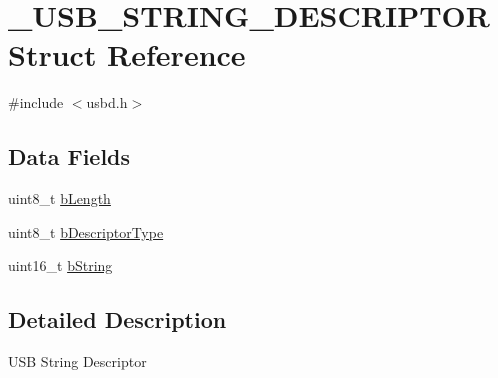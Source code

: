 \hypertarget{struct__USB__STRING__DESCRIPTOR}{\section{\-\_\-\-U\-S\-B\-\_\-\-S\-T\-R\-I\-N\-G\-\_\-\-D\-E\-S\-C\-R\-I\-P\-T\-O\-R Struct Reference}
\label{struct__USB__STRING__DESCRIPTOR}
}


{\ttfamily \#include $<$usbd.\-h$>$}

\subsection*{Data Fields}
\begin{DoxyCompactItemize}
\item 
uint8\-\_\-t \hyperlink{struct__USB__STRING__DESCRIPTOR_a27d5cd3019611e53d3588192d4c72b05}{b\-Length}
\item 
uint8\-\_\-t \hyperlink{struct__USB__STRING__DESCRIPTOR_a03f4e8b870398d2410b49adce1466054}{b\-Descriptor\-Type}
\item 
uint16\-\_\-t \hyperlink{struct__USB__STRING__DESCRIPTOR_abbe1c4825365ecb9af165153435a6ef4}{b\-String}
\end{DoxyCompactItemize}


\subsection{Detailed Description}
U\-S\-B String Descriptor 

